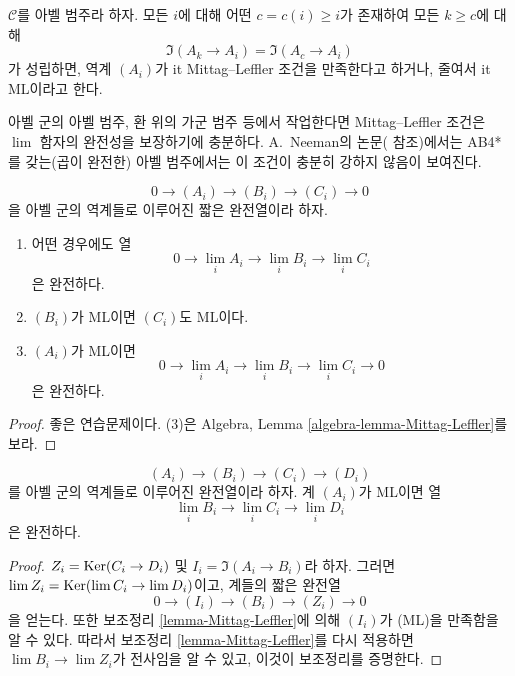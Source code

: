 \begin{definition}
\label{definition-Mittag-Leffler}
$\mathcal{C}$를 아벨 범주라 하자. 모든 $i$에 대해 어떤
$c = c(i) \geq i$가 존재하여 모든 $k \geq c$에 대해
$$
\Im(A_k \to A_i) = \Im(A_c \to A_i)
$$
가 성립하면, 역계 $(A_i)$가 {it Mittag--Leffler 조건}을 만족한다고
하거나, 줄여서 {it ML}이라고 한다.
\end{definition}

\noindent
아벨 군의 아벨 범주, 환 위의 가군 범주 등에서 작업한다면
Mittag--Leffler 조건은 $\lim$ 함자의 완전성을 보장하기에 충분하다.
A.\ Neeman의 논문(\cite{Neeman-Counterexample} 참조)에서는 AB4*를
갖는(곱이 완전한) 아벨 범주에서는 이 조건이 충분히 강하지 않음이
보여진다.

\begin{lemma}
\label{lemma-Mittag-Leffler}
$$
0 \to (A_i) \to (B_i) \to (C_i) \to 0
$$
을 아벨 군의 역계들로 이루어진 짧은 완전열이라 하자.
\begin{enumerate}
\item 어떤 경우에도 열
$$
0 \to \lim_i A_i \to \lim_i B_i \to \lim_i C_i
$$
은 완전하다.
\item $(B_i)$가 ML이면 $(C_i)$도 ML이다.
\item $(A_i)$가 ML이면
$$
0 \to \lim_i A_i \to \lim_i B_i \to \lim_i C_i \to 0
$$
은 완전하다.
\end{enumerate}
\end{lemma}

\begin{proof}
좋은 연습문제이다. (3)은 Algebra, Lemma
\ref{algebra-lemma-Mittag-Leffler}를 보라.
\end{proof}

\begin{lemma}
\label{lemma-apply-Mittag-Leffler}
$$
(A_i) \to (B_i) \to (C_i) \to (D_i)
$$
를 아벨 군의 역계들로 이루어진 완전열이라 하자. 계 $(A_i)$가 ML이면
열
$$
\lim_i B_i \to \lim_i C_i \to \lim_i D_i
$$
은 완전하다.
\end{lemma}

\begin{proof}
$Z_i = \mathop{\mathrm{Ker}}(C_i \to D_i)$ 및 $I_i = \Im(A_i \to B_i)$라 하자.
그러면 $\mathop{\mathrm{lim}}\nolimits Z_i = \mathop{\mathrm{Ker}}(\mathop{\mathrm{lim}}\nolimits C_i \to \mathop{\mathrm{lim}}\nolimits D_i)$이고, 계들의 짧은 완전열
$$
0 \to (I_i) \to (B_i) \to (Z_i) \to 0
$$
을 얻는다. 또한 보조정리 \ref{lemma-Mittag-Leffler}에 의해
$(I_i)$가 (ML)을 만족함을 알 수 있다. 따라서 보조정리
\ref{lemma-Mittag-Leffler}를 다시 적용하면
$\lim B_i \to \lim Z_i$가 전사임을 알 수 있고, 이것이 보조정리를
증명한다.
\end{proof}

